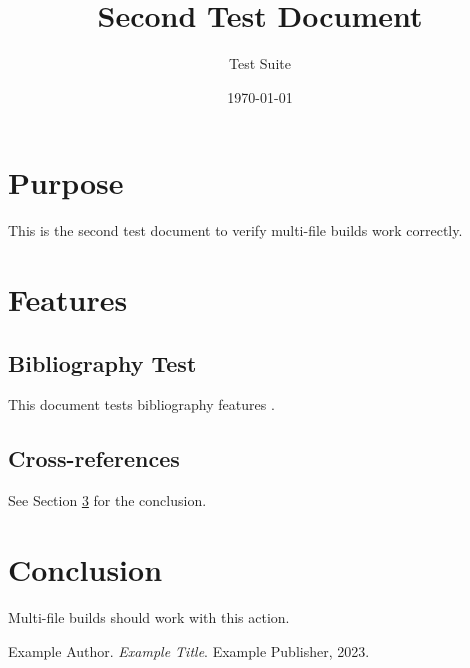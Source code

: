 \documentclass{article}
\title{Second Test Document}
\author{Test Suite}
\date{\today}
\begin{document}
\maketitle

\tableofcontents

\section{Purpose}
This is the second test document to verify multi-file builds work correctly.

\section{Features}
\subsection{Bibliography Test}
This document tests bibliography features \cite{example}.

\subsection{Cross-references}
See Section \ref{sec:conclusion} for the conclusion.

\section{Conclusion}
\label{sec:conclusion}
Multi-file builds should work with this action.

\begin{thebibliography}{9}
Example Author.
\textit{Example Title}.
Example Publisher, 2023.
\end{thebibliography}
\end{document}
